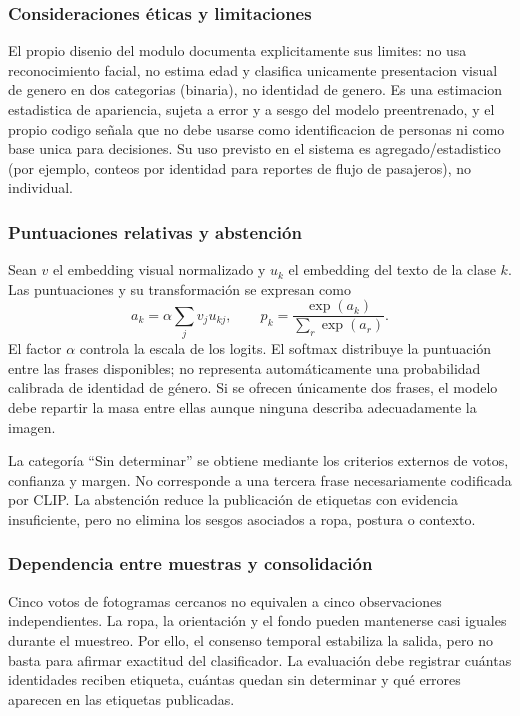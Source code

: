 \documentclass[12pt,letterpaper]{article}
\begin{document}
\subsubsection{Consideraciones éticas y limitaciones}

El propio disenio del modulo documenta explicitamente sus limites: no usa reconocimiento facial, no estima edad y clasifica unicamente presentacion visual de genero en dos categorias (binaria), no identidad de genero. Es una estimacion estadistica de apariencia, sujeta a error y a sesgo del modelo preentrenado, y el propio codigo señala que no debe usarse como identificacion de personas ni como base unica para decisiones. Su uso previsto en el sistema es agregado/estadistico (por ejemplo, conteos por identidad para reportes de flujo de pasajeros), no individual.


\subsubsection{Puntuaciones relativas y abstención}
Sean $v$ el embedding visual normalizado y $u_k$ el embedding del texto de la clase $k$. Las puntuaciones y su transformación se expresan como
\[
 a_k=\alpha\sum_j v_j u_{kj},\qquad
 p_k=\frac{\exp(a_k)}{\sum_r\exp(a_r)}.
\]
El factor $\alpha$ controla la escala de los logits. El softmax distribuye la puntuación entre las frases disponibles; no representa automáticamente una probabilidad calibrada de identidad de género. Si se ofrecen únicamente dos frases, el modelo debe repartir la masa entre ellas aunque ninguna describa adecuadamente la imagen.

La categoría ``Sin determinar'' se obtiene mediante los criterios externos de votos, confianza y margen. No corresponde a una tercera frase necesariamente codificada por CLIP. La abstención reduce la publicación de etiquetas con evidencia insuficiente, pero no elimina los sesgos asociados a ropa, postura o contexto.

\subsubsection{Dependencia entre muestras y consolidación}
Cinco votos de fotogramas cercanos no equivalen a cinco observaciones independientes. La ropa, la orientación y el fondo pueden mantenerse casi iguales durante el muestreo. Por ello, el consenso temporal estabiliza la salida, pero no basta para afirmar exactitud del clasificador. La evaluación debe registrar cuántas identidades reciben etiqueta, cuántas quedan sin determinar y qué errores aparecen en las etiquetas publicadas.
\end{document}
